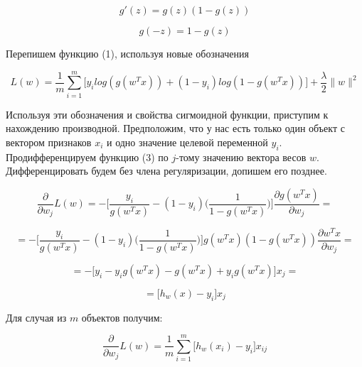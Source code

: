 \documentclass{article}
\begin{document}
	
	\begin{equation*}
		g\prime(z) = g(z)(1 - g(z))
	\end{equation*}
	
	\vspace{-0.5cm}
	\begin{equation*}
		g(-z) = 1 - g(z)
	\end{equation*}

	\begin{center}
		Перепишем функцию (1), используя новые обозначения
	\end{center}

	\begin{equation}
		L(w) = \frac{1}{m} \sum\limits_{i=1}^m \biggl[y_i log(g(w^Tx)) + (1 - y_i) log(1 - g(w^Tx))\biggr] + \frac{\lambda}{2} \|w\|^2
	\end{equation}
	
	Используя эти обозначения и свойства сигмоидной функции, приступим к нахождению производной. Предположим, что у нас есть только один объект с вектором признаков $x_i$ и одно значение целевой переменной $y_i$. Продифференцируем функцию (3) по $j$-тому значению вектора весов $w$. Дифференцировать будем без члена регуляризации, допишем его позднее.
	
	\begin{equation*}
		\frac{\partial}{\partial w_j} L(w) = - \biggl[\frac{y_i}{g(w^Tx)} - (1 - y_i)\biggl(\frac{1}{1 - g(w^Tx)}\biggr)\biggr] \frac{\partial g(w^Tx)}{\partial w_j} = 
	\end{equation*}

	\begin{equation*}
		 = - \biggl[\frac{y_i}{g(w^Tx)} - (1 - y_i)\biggl(\frac{1}{1 - g(w^Tx)}\biggr)\biggr] g(w^Tx) (1 - g(w^Tx)) \frac{\partial w^Tx}{\partial w_j} = 
	\end{equation*}

	\begin{equation*}
		= - \bigl[y_i - y_i g(w^Tx) - g(w^Tx) + y_i g(w^Tx)\bigr] x_j = 
	\end{equation*}

	\begin{equation*}
		= \bigl[h_w(x) - y_i\bigr] x_j
	\end{equation*}

	\begin{center}
		Для случая из $m$ объектов получим:
	\end{center}

	\begin{equation}
		\frac{\partial}{\partial w_j} L(w) = \frac{1}{m} \sum\limits_{i=1}^m \bigl[h_w(x_i) - y_i\bigr] x_{ij}
	\end{equation}
\end{document}
